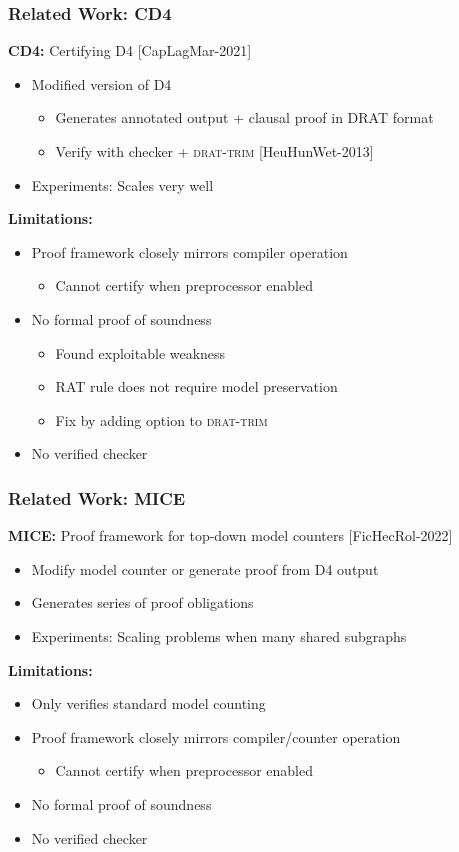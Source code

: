 \documentclass[t,pdf]{beamer}
\newcommand{\reference}[1]{{\footnotesize [#1]}}
\newcommand{\bitem}{\item[$\bullet$]}
\begin{document}
\begin{frame}
  \frametitle{Related Work: CD4}
  \medskip
  
  {\bf CD4:} Certifying D4 \reference{CapLagMar-2021}
  \begin{itemize}
  \item Modified version of D4
    \begin{itemize}
    \item Generates annotated output + clausal proof in DRAT format
    \item Verify with checker + \textsc{drat-trim} \reference{HeuHunWet-2013}
    \end{itemize}
  \item Experiments: Scales very well
  \end{itemize}
   \medskip
       {\bf Limitations:}
       \begin{itemize}
       \item Proof framework closely mirrors compiler operation
         \begin{itemize}
           \bitem Cannot certify when preprocessor enabled
         \end{itemize}
       \item No formal proof of soundness
         \begin{itemize}
         \bitem Found exploitable weakness
         \bitem RAT rule does not require model preservation
         \bitem Fix by adding option to \textsc{drat-trim}
         \end{itemize}
       \item No verified checker
       \end{itemize}

\end{frame}


\begin{frame}
  \frametitle{Related Work: MICE}
  \medskip
   {\bf MICE:} Proof framework for top-down model counters \reference{FicHecRol-2022}
   \begin{itemize}
   \item Modify model counter or generate proof from D4 output
   \item Generates series of proof obligations
   \item Experiments: Scaling problems when many shared subgraphs
   \end{itemize}
   \medskip
       {\bf Limitations:}
       \begin{itemize}
       \item Only verifies standard model counting
       \item Proof framework closely mirrors compiler/counter operation
         \begin{itemize}
           \bitem Cannot certify when preprocessor enabled
         \end{itemize}
       \item No formal proof of soundness
       \item No verified checker
       \end{itemize}
\end{frame}
\end{document}
